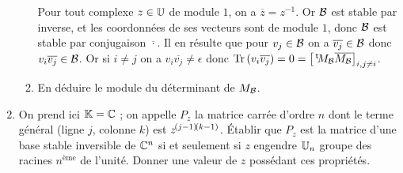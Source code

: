 \documentclass[a4paper,french,bookmarks]{article}
\begin{document}
\begin{enumerate}
\begin{enumerate}
{\begin{enumerate}
                    \itt Pour tout complexe $z \in \mathbb{U}$ de module $1$, on a $\overline{z} = z^{-1}$. Or $\mathcal{B}$ est stable par inverse, et les coordonnées de ses vecteurs sont de module $1$, donc $\mathcal{B}$ est stable par conjugaison $\overline{\cdot}$. Il en résulte que pour $v_j \in \mathcal{B}$ on a $\overline{v_j} \in \mathcal{B}$ donc $v_i\overline{v_j} \in \mathcal{B}$. Or si $i \neq j$ on a $v_i\overline{v_j} \neq \epsilon$ donc $\Tr{v_i\overline{v_j}} = 0 = \intc{\mtrans{M_\bcB}\overline{M_\bcB}}_{i, j \neq i}$.
                \end{enumerate}
            }
            \nobefore\yesafter
            \yesbefore
            
            \item En déduire le module du déterminant de $M_{\mathcal{B}}$.
            
            \noafter
            \nobefore\yesafter
            \yesbefore
        \end{enumerate}
        
        \item On prend ici $\mathbb{K} = \mathbb{C}$ ; on appelle $P_z$ la matrice carrée d'ordre $n$ dont le terme général (ligne $j$, colonne $k$) est $z^{\!\left(j-1\right)\!\left(k-1\right)}$. Établir que $P_z$ est la matrice d'une base stable inversible de $\mathbb{C}^n$ si et seulement si $z$ engendre $\mathbb{U}_n$ groupe des racines $n^\text{ème}$ de l'unité. Donner une valeur de $z$ possédant ces propriétés.
        

\end{enumerate}
\end{document}
